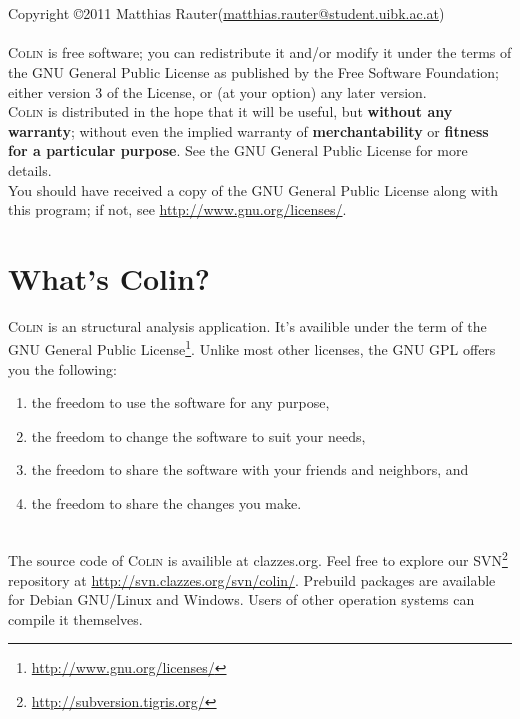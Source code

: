 \documentclass[a4paper,11pt]{report}
\newcommand{\Colin}[0]{\textsc{Colin }}
\begin{document}



\clearpage
\ \\
\vspace{470pt}
\ \\
Copyright \copyright 2011 Matthias Rauter(\href{mailto:matthias.rauter@student.uibk.ac.at}{matthias.rauter@student.uibk.ac.at})\\
\vspace{20pt} \ \\
\Colin is free software; you can redistribute it and/or modify it under the terms of the GNU General Public License as published by the Free Software Foundation; either version 3 of the License, or (at your option) any later version.\\
\Colin is distributed in the hope that it will be useful, but \textbf{without any warranty}; without even the implied warranty of \textbf{merchantability} or \textbf{fitness for a particular purpose}. See the GNU General Public License for more details.\\
You should have received a copy of the GNU General Public License along with this program; if not, see \url{http://www.gnu.org/licenses/}.


\clearpage

\tableofcontents
\listoffigures


\clearpage
{}

\chapter{What's Colin?}
\label{cha:colin}

\Colin is an structural analysis application. It's availible under the term of the GNU General Public License\footnote{\url{http://www.gnu.org/licenses/}}. Unlike most other licenses, the GNU GPL offers you the following:
\begin{enumerate}
	\item [0] the freedom to use the software for any purpose,
	\item [1] the freedom to change the software to suit your needs,
	\item [2] the freedom to share the software with your friends and neighbors, and
	\item [3] the freedom to share the changes you make.
\end{enumerate}\\
The source code of \Colin is availible at clazzes.org. Feel free to explore our SVN\footnote{\url{http://subversion.tigris.org/}} repository at \url{http://svn.clazzes.org/svn/colin/}. Prebuild packages are available for Debian GNU/Linux and Windows. Users of other operation systems can compile it themselves.\\
\end{document}
